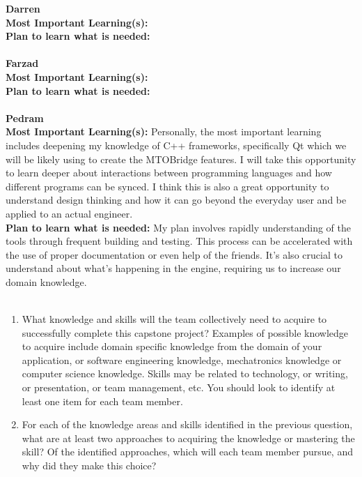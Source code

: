 \documentclass[12pt]{article}
\begin{document}
\noindent\textbf{Darren}\\
\textbf{Most Important Learning(s):}\\
\textbf{Plan to learn what is needed:}\\\\

\noindent\textbf{Farzad}\\
\textbf{Most Important Learning(s):}\\
\textbf{Plan to learn what is needed:}\\\\

\noindent\textbf{Pedram}\\
\textbf{Most Important Learning(s):} Personally, the most important learning includes deepening my knowledge of C++ frameworks, specifically Qt which we will be likely using to create the MTOBridge features. I will take this opportunity to learn deeper about interactions between programming languages and how different programs can be synced. I think this is also a great opportunity to understand design thinking and how it can go beyond the everyday user and be applied to an actual engineer. \\
\textbf{Plan to learn what is needed:} My plan involves rapidly understanding of the tools through frequent building and testing. This process can be accelerated with the use of proper documentation or even help of the friends. It’s also crucial to understand about what’s happening in the engine, requiring us to increase our domain knowledge. \\\\

\begin{enumerate}
  \item What knowledge and skills will the team collectively need to acquire to
  successfully complete this capstone project?  Examples of possible knowledge
  to acquire include domain specific knowledge from the domain of your
  application, or software engineering knowledge, mechatronics knowledge or
  computer science knowledge.  Skills may be related to technology, or writing,
  or presentation, or team management, etc.  You should look to identify at
  least one item for each team member.
  \item For each of the knowledge areas and skills identified in the previous
  question, what are at least two approaches to acquiring the knowledge or
  mastering the skill?  Of the identified approaches, which will each team
  member pursue, and why did they make this choice?
\end{enumerate}
\end{document}

